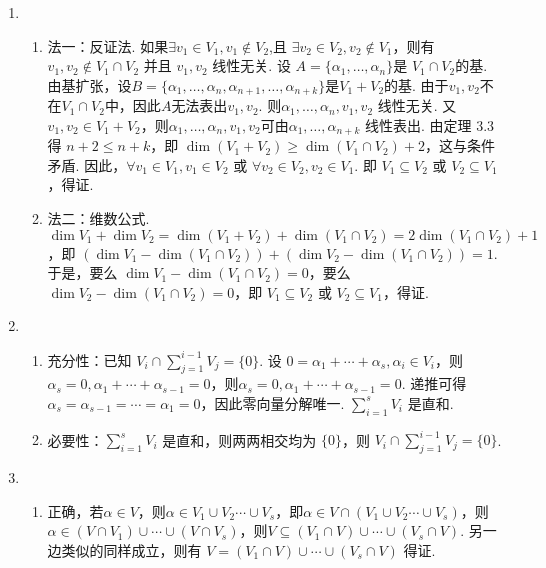 \begin{enumerate}
    \item \begin{enumerate}
              \item 法一：反证法. 如果$\exists v_1\in V_1,v_1\not\in V_2$,且 $\exists v_2\in V_2,v_2\not\in V_1$，则有 $v_1,v_2\not \in V_1\cap V_2$ 并且 $v_1,v_2$ 线性无关. 设 $A=\{\alpha_1,\ldots ,\alpha_n\}$是 $V_1\cap V_2$的基. 由基扩张，设$B=\{\alpha_1,\ldots ,\alpha_n,\alpha_{n+1},\ldots ,\alpha_{n+k}\}$是$V_1+V_2$的基. 由于$v_1,v_2$不在$V_1\cap V_2$中，因此$A$无法表出$v_1,v_2$. 则$\alpha_1,\ldots ,\alpha_n,v_1,v_2$ 线性无关. 又$v_1,v_2\in V_1+V_2$，则$\alpha_1,\ldots ,\alpha_n,v_1,v_2$可由$\alpha_1,\ldots ,\alpha_{n+k}$ 线性表出. 由定理 $3.3$ 得 $n+2\leqslant n+k$，即 $\dim (V_1+V_2)\ge\dim (V_1\cap V_2)+2$，这与条件矛盾. 因此，$\forall v_1\in V_1,v_1\in V_2$ 或 $\forall v_2\in V_2,v_2\in V_1$. 即 $V_1\subseteq V_2$ 或 $V_2\subseteq V_1$，得证.

              \item 法二：维数公式. $\dim V_1+\dim V_2=\dim  (V_1+V_2)+\dim  (V_1\cap V_2)=2\dim  (V_1\cap V_2)+1$，即 $(\dim V_1-\dim  (V_1\cap V_2))+ (\dim V_2-\dim  (V_1\cap V_2))=1$. 于是，要么 $\dim V_1-\dim  (V_1\cap V_2)=0$，要么 $\dim V_2-\dim  (V_1\cap V_2)=0$，即 $V_1\subseteq V_2$ 或 $V_2\subseteq V_1$，得证.
          \end{enumerate}

    \item \begin{enumerate}
              \item 充分性：已知 $V_i\cap \displaystyle\sum_{j=1}^{i-1}V_j=\{0\}$. 设 $0=\alpha_1+\cdots+\alpha_s,\alpha_i\in V_i$，则 $\alpha_s=0,\alpha_1+\cdots+\alpha_{s-1}=0$，则$\alpha_s=0,\alpha_1+\cdots+\alpha_{s-1}=0$. 递推可得 $\alpha_s=\alpha_{s-1}=\cdots=\alpha_1=0$，因此零向量分解唯一. $\displaystyle\sum_{i=1}^sV_i$ 是直和.

              \item 必要性：$\displaystyle\sum_{i=1}^sV_i$ 是直和，则两两相交均为 $\{0\}$，则 $V_i\cap \displaystyle\sum_{j=1}^{i-1}V_j=\{0\}$.
          \end{enumerate}

    \item \begin{enumerate}
              \item 正确，若$\alpha\in V$，则$\alpha \in V_1\cup V_2\cdots \cup V_s$，即$\alpha \in V\cap (V_1\cup V_2\cdots \cup V_s)$，则$\alpha \in (V\cap V_1)\cup \cdots \cup (V\cap V_s)$，则$V\subseteq(V_1\cap V)\cup \cdots \cup (V_s\cap V)$. 另一边类似的同样成立，则有 $V=(V_1\cap V)\cup \cdots \cup (V_s\cap V)$ 得证.


\end{enumerate}
\end{enumerate}
